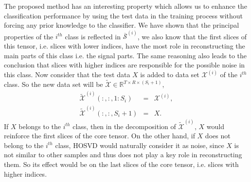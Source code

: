 \documentclass[journal]{IEEEtran}
\begin{document}
	The proposed method has an interesting property which allows us to enhance the classification performance by using the test data in the training process without forcing any prior knowledge to the classifier. 
	We have shown that the principal properties of the $i^{th}$ class is reflected in $\overline{\mathcal{S}}^{(i)}$, we also know that the first slices of this tensor, i.e. slices with lower indices, have the most role in reconstructing the main parts of this class i.e. the signal parts. The same reasoning also leads to the conclusion that slices with higher indices are responsible for the possible noise in this class. 
	Now consider that the test data $X$ is added to data set $\mathcal{X}^{(i)}$ of the $i^{th}$ class. So the new data set will be
	$\mathcal{\widetilde{X}}\in \mathbb{R}^{T\times R \times (S_{i}+1)}$,
	\begin{eqnarray*}
		\widetilde{\mathcal{X}}^{(i)}(:,:,1:S_i)&=&{\mathcal{X}}^{(i)},\\
		\widetilde{\mathcal{X}}^{(i)}(:,:,S_i+1)&=&X.
	\end{eqnarray*}
	If $X$ belongs to the $i^{th}$ class, then in the decomposition of $\widetilde{\mathcal{X}}^{(i)}$, $X$ would reinforce the first slices of the core tensor. On the other hand, if $X$ does not belong to the $i^{th}$ class, HOSVD would naturally consider it as noise, since $X$ is not similar to other samples and thus does not play a key role in reconstructing them. So its effect would be on the last slices of the core tensor, i.e. slices with higher indices.
	
\end{document}
